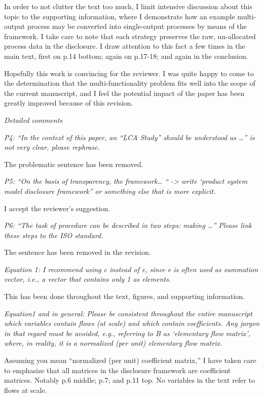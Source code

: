 \documentclass[11pt,letterpaper]{article}
\begin{document}
In order to not clutter the text too much, I limit intensive discussion about this topic to the supporting information, where I demonstrate how an example multi-output process may be converted into single-output processes by means of the framework.  I take care to note that each strategy preserves the raw, un-allocated process data in the disclosure.  I draw attention to this fact a few times in the main text, first on p.14 bottom; again on p.17-18; and again in the conclusion.

Hopefully this work is convincing for the reviewer. I was quite happy to come to the determination that the multi-functionality problem fits well into the scope of the current manuscript, and I feel the potential impact of the paper has been greatly improved because of this revision.

\emph{Detailed comments}

\emph{P4: “In the context of this paper, an “LCA Study” should be understood as …” is not very clear, please rephrase.}

The problematic sentence has been removed.

\emph{P5: “On the basis of transparency, the framework… “ -> write ‘product system model disclosure framework” or something else that is more explicit.}

I accept the reviewer's suggestion.

\emph{P6: “The task of procedure can be described in two steps: making …” Please link these steps to the ISO standard.}

The sentence has been removed in the revision.

\emph{Equation 1: I recommend using c instead of e, since e is often used as summation vector, i.e., a vector that contains only 1 as elements.}

This has been done throughout the text, figures, and supporting information.

\emph{Equation1 and in general: Please be consistent throughout the entire manuscript which variables contain flows (at scale) and which contain coefficients. Any jargon in that regard must be avoided, e.g., referring to B as ‘elementary flow matrix’, where, in reality, it is a normalized (per unit) elementary flow matrix.}

Assuming you mean ``normalized (per unit) coefficient matrix,'' I have taken care to emphasize that all matrices in the disclosure framework are coefficient matrices.  Notably p.6 middle; p.7; and p.11 top.  No variables in the text refer to flows at scale.  
\end{document}
